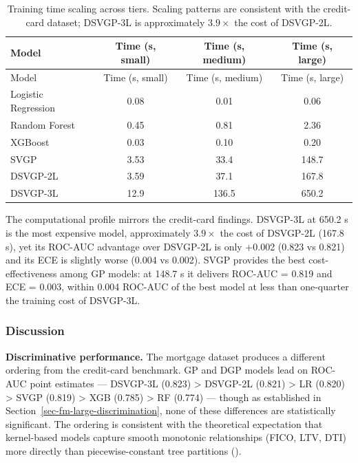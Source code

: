 \documentclass[
  letterpaper,
  DIV=11,
  numbers=noendperiod]{scrartcl}
\begin{document}
\begin{longtable}[]{@{}lccc@{}}
\caption{Training time scaling across tiers. Scaling patterns are
consistent with the credit-card dataset; DSVGP-3L is approximately
\(3.9\times\) the cost of
DSVGP-2L.}\label{tbl-fm-runtime}\tabularnewline
\toprule\noalign{}
Model & Time (s, small) & Time (s, medium) & Time (s, large) \\
\midrule\noalign{}
\endfirsthead
\toprule\noalign{}
Model & Time (s, small) & Time (s, medium) & Time (s, large) \\
\midrule\noalign{}
\endhead
\bottomrule\noalign{}
\endlastfoot
Logistic Regression & 0.08 & 0.01 & 0.06 \\
Random Forest & 0.45 & 0.81 & 2.36 \\
XGBoost & 0.03 & 0.10 & 0.20 \\
SVGP & 3.53 & 33.4 & 148.7 \\
DSVGP-2L & 3.59 & 37.1 & 167.8 \\
DSVGP-3L & 12.9 & 136.5 & 650.2 \\
\end{longtable}

The computational profile mirrors the credit-card findings. DSVGP-3L at
650.2 s is the most expensive model, approximately \(3.9\times\) the
cost of DSVGP-2L (167.8 s), yet its ROC-AUC advantage over DSVGP-2L is
only +0.002 (0.823 vs 0.821) and its ECE is slightly worse (0.004 vs
0.002). SVGP provides the best cost-effectiveness among GP models: at
148.7 s it delivers ROC-AUC = 0.819 and ECE = 0.003, within 0.004
ROC-AUC of the best model at less than one-quarter the training cost of
DSVGP-3L.

\subsubsection{Discussion}\label{sec-fm-discussion}

\textbf{Discriminative performance.} The mortgage dataset produces a
different ordering from the credit-card benchmark. GP and DGP models
lead on ROC-AUC point estimates --- DSVGP-3L (0.823) \textgreater{}
DSVGP-2L (0.821) \textgreater{} LR (0.820) \textgreater{} SVGP (0.819)
\textgreater{} XGB (0.785) \textgreater{} RF (0.774) --- though as
established in Section~\ref{sec-fm-large-discrimination}, none of these
differences are statistically significant. The ordering is consistent
with the theoretical expectation that kernel-based models capture smooth
monotonic relationships (FICO, LTV, DTI) more directly than
piecewise-constant tree partitions
().
\end{document}
